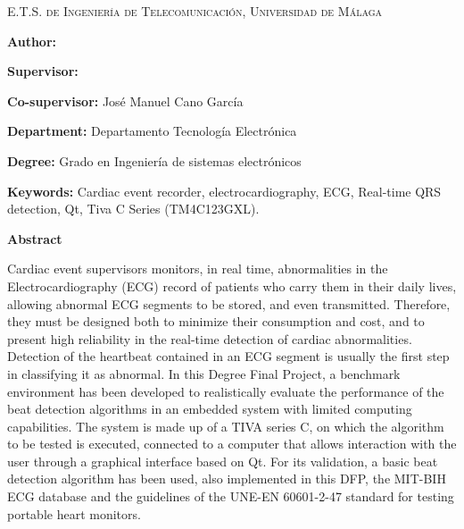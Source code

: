 
\pagestyle{fancy}

\begin{center}
	\scshape
	E.T.S. de Ingeniería de Telecomunicación, Universidad de Málaga
\end{center}

\bigskip

\begin{center}
	\Large \scshape
	\textbf{\tfgtitlenameENG}
\end{center}

\bigskip \bigskip \bigskip

\begin{minipage}{\textwidth}

\textbf{Author:} \tfgauthorname

\medskip

\textbf{Supervisor:} \tfgtutorname

\medskip

\textbf{Co-supervisor:} José Manuel Cano García

\medskip

\textbf{Department:} Departamento Tecnología Electrónica

\medskip

\textbf{Degree:} Grado en Ingeniería de sistemas electrónicos

\medskip

\textbf{Keywords:} Cardiac event recorder, electrocardiography, ECG, Real-time QRS detection, Qt, Tiva C Series (TM4C123GXL).

\bigskip \bigskip


\end{minipage}

\begin{center}
	\textbf{Abstract}
\end{center}

Cardiac event supervisors monitors, in real time, abnormalities in the Electrocardiography (ECG) record of patients who carry them in their daily lives, allowing abnormal ECG segments to be stored, and even transmitted. Therefore, they must be designed both to minimize their consumption and cost, and to present high reliability in the real-time detection of cardiac abnormalities. Detection of the heartbeat contained in an ECG segment is usually the first step in classifying it as abnormal. In this Degree Final Project, a benchmark environment has been developed to realistically evaluate the performance of the beat detection algorithms in an embedded system with limited computing capabilities. The system is made up of a TIVA series C, on which the algorithm to be tested is executed, connected to a computer that allows interaction with the user through a graphical interface based on Qt. For its validation, a basic beat detection algorithm has been used, also implemented in this DFP, the MIT-BIH ECG database and the guidelines of the UNE-EN 60601-2-47 standard for testing portable heart monitors.


\blankpage
